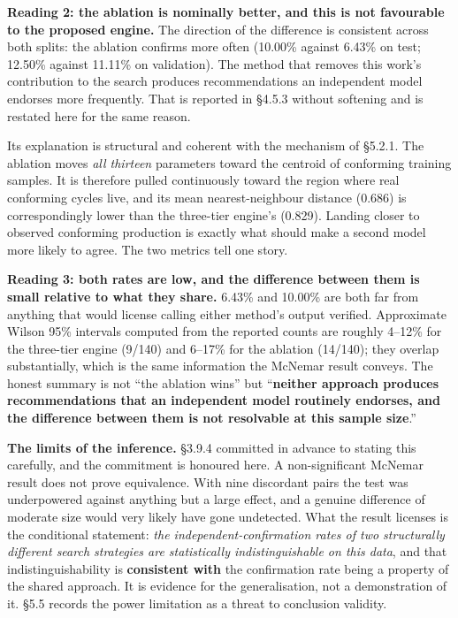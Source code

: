 \textbf{Reading 2: the ablation is nominally better, and this is not favourable to the proposed engine.} The direction of the difference is consistent across both splits: the ablation confirms more often (10.00\% against 6.43\% on test; 12.50\% against 11.11\% on validation). The method that removes this work's contribution to the search produces recommendations an independent model endorses more frequently. That is reported in §4.5.3 without softening and is restated here for the same reason.

Its explanation is structural and coherent with the mechanism of §5.2.1. The ablation moves \emph{all thirteen} parameters toward the centroid of conforming training samples. It is therefore pulled continuously toward the region where real conforming cycles live, and its mean nearest-neighbour distance (0.686) is correspondingly lower than the three-tier engine's (0.829). Landing closer to observed conforming production is exactly what should make a second model more likely to agree. The two metrics tell one story.

\textbf{Reading 3: both rates are low, and the difference between them is small relative to what they share.} 6.43\% and 10.00\% are both far from anything that would license calling either method's output verified. Approximate Wilson 95\% intervals computed from the reported counts are roughly 4--12\% for the three-tier engine (9/140) and 6--17\% for the ablation (14/140); they overlap substantially, which is the same information the McNemar result conveys. The honest summary is not ``the ablation wins'' but ``\textbf{neither approach produces recommendations that an independent model routinely endorses, and the difference between them is not resolvable at this sample size}.''

\textbf{The limits of the inference.} §3.9.4 committed in advance to stating this carefully, and the commitment is honoured here. A non-significant McNemar result does not prove equivalence. With nine discordant pairs the test was underpowered against anything but a large effect, and a genuine difference of moderate size would very likely have gone undetected. What the result licenses is the conditional statement: \emph{the independent-confirmation rates of two structurally different search strategies are statistically indistinguishable on this data}, and that indistinguishability is \textbf{consistent with} the confirmation rate being a property of the shared approach. It is evidence for the generalisation, not a demonstration of it. §5.5 records the power limitation as a threat to conclusion validity.

